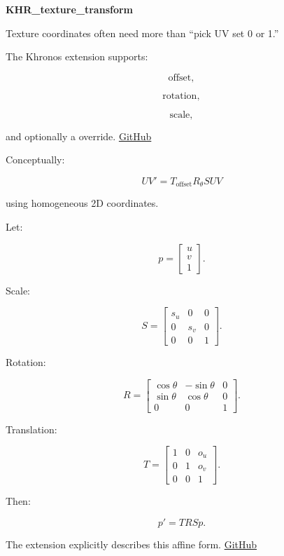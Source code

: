 \textbf{KHR\_texture\_transform}

Texture coordinates often need more than ``pick UV set 0 or 1.''

The Khronos  extension supports:

\[
\text{offset},
\]

\[
\text{rotation},
\]

\[
\text{scale},
\]

and optionally a  override. \href{https://github.com/KhronosGroup/glTF/blob/main/extensions/2.0/Khronos/KHR_texture_transform/README.md?utm_source=chatgpt.com}{GitHub}

Conceptually:

\[
\boxed{
UV'
=
T_{\text{offset}}
R_{\theta}
S
UV
}
\]

using homogeneous 2D coordinates.

Let:

\[
p=
\begin{bmatrix}
u\\v\\1
\end{bmatrix}.
\]

Scale:

\[
S=
\begin{bmatrix}
s_u&0&0\\
0&s_v&0\\
0&0&1
\end{bmatrix}.
\]

Rotation:

\[
R=
\begin{bmatrix}
\cos\theta&-\sin\theta&0\\
\sin\theta&\cos\theta&0\\
0&0&1
\end{bmatrix}.
\]

Translation:

\[
T=
\begin{bmatrix}
1&0&o_u\\
0&1&o_v\\
0&0&1
\end{bmatrix}.
\]

Then:

\[
\boxed{
p'=TRSp.
}
\]

The extension explicitly describes this affine form. \href{https://github.com/KhronosGroup/glTF/blob/main/extensions/2.0/Khronos/KHR_texture_transform/README.md?utm_source=chatgpt.com}{GitHub}

